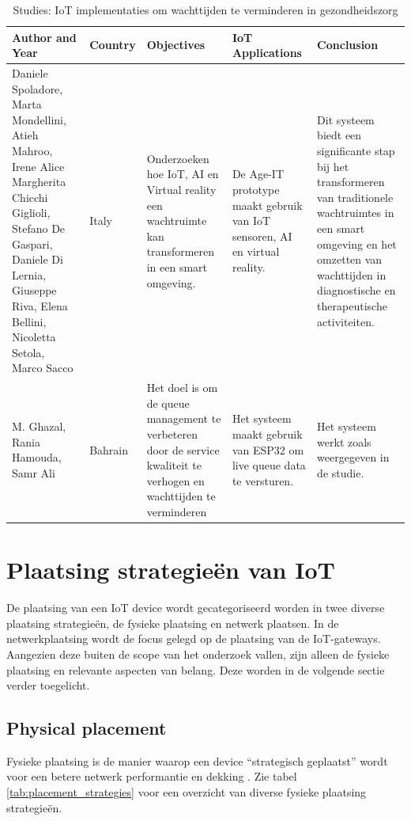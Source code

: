 \begin{table}[h]
    \centering
    \tiny
    \caption{Studies: IoT implementaties om wachttijden te verminderen in gezondheidszorg \autocite{Spoladore2024, Ghazal2015}}
    \begin{tabularx}{\textwidth}{|p{2.5cm}|p{1cm}|p{4cm}|p{4.5cm}|p{3cm}|}
        \hline
        \textbf{Author and Year} & \textbf{Country} & \textbf{Objectives} & \textbf{IoT Applications} & \textbf{Conclusion} \\
        \hline
        Daniele Spoladore, Marta Mondellini, Atieh Mahroo, Irene Alice Margherita Chicchi Giglioli, Stefano De Gaspari, Daniele Di Lernia, Giuseppe Riva, Elena Bellini, Nicoletta Setola, Marco Sacco   
        & Italy 
        & Onderzoeken hoe IoT, AI en Virtual reality een wachtruimte kan transformeren in een smart omgeving. 
        & De Age-IT prototype maakt gebruik van IoT sensoren, AI en virtual reality.
        & Dit systeem biedt een significante stap bij het transformeren van traditionele wachtruimtes in een smart omgeving en het omzetten van wachttijden in diagnostische en therapeutische activiteiten. \\
        \hline
        M. Ghazal, Rania Hamouda, Samr Ali
        & Bahrain 
        & Het doel is om de queue management te verbeteren door de service kwaliteit te verhogen en wachttijden te verminderen
        & Het systeem maakt gebruik van ESP32 om live queue data te versturen.
        & Het systeem werkt zoals weergegeven in de studie.  \\
        \hline
    \end{tabularx}
    \label{tab:IoT_waiting_time_reduction_waitingroom}
\end{table}


\section{Plaatsing strategieën van IoT}
De plaatsing van een IoT device wordt gecategoriseerd worden in twee diverse plaatsing strategieën, de fysieke plaatsing en netwerk plaatsen. In de netwerkplaatsing wordt de focus gelegd op de plaatsing van de IoT-gateways. Aangezien deze buiten de scope van het onderzoek vallen, zijn alleen de fysieke plaatsing en relevante aspecten van belang. Deze worden in de volgende sectie verder toegelicht.

\subsection{Physical placement}
Fysieke plaatsing is de manier waarop een device “strategisch geplaatst” wordt voor een betere netwerk performantie en dekking \autocite{Xia2018}. Zie tabel \ref{tab:placement_strategies} voor een overzicht van diverse fysieke plaatsing strategieën.

